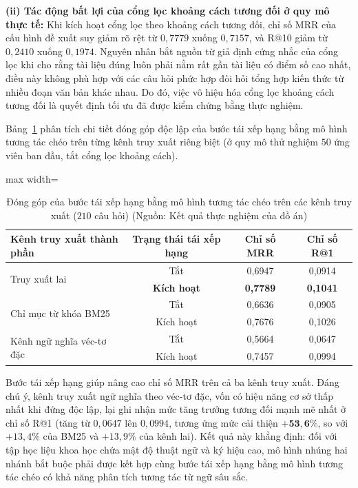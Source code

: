 \textbf{(ii) Tác động bất lợi của cổng lọc khoảng cách tương đối ở quy mô thực tế:} Khi kích hoạt cổng lọc theo khoảng cách tương đối, chỉ số MRR của cấu hình đề xuất suy giảm rõ rệt từ $0{,}7779$ xuống $0{,}7157$, và R@10 giảm từ $0{,}2410$ xuống $0{,}1974$. Nguyên nhân bắt nguồn từ giả định cứng nhắc của cổng lọc khi cho rằng tài liệu đúng luôn phải nằm rất gần tài liệu có điểm số cao nhất, điều này không phù hợp với các câu hỏi phức hợp đòi hỏi tổng hợp kiến thức từ nhiều đoạn văn bản khác nhau. Do đó, việc vô hiệu hóa cổng lọc khoảng cách tương đối là quyết định tối ưu đã được kiểm chứng bằng thực nghiệm.

Bảng~\ref{tab:ablation_rerank} phân tích chi tiết đóng góp độc lập của bước tái xếp hạng bằng mô hình tương tác chéo trên từng kênh truy xuất riêng biệt (ở quy mô thử nghiệm $50$ ứng viên ban đầu, tắt cổng lọc khoảng cách).

\begin{table}[H]
\centering
\caption{Đóng góp của bước tái xếp hạng bằng mô hình tương tác chéo trên các kênh truy xuất ($210$ câu hỏi) (Nguồn: Kết quả thực nghiệm của đồ án)}
\label{tab:ablation_rerank}
\small
\begin{adjustbox}{max width=\textwidth}
\begin{tabular}{lccc}
\toprule
\textbf{Kênh truy xuất thành phần} & \textbf{Trạng thái tái xếp hạng} & \textbf{Chỉ số MRR} & \textbf{Chỉ số R@1} \\
\midrule
\multirow{2}{*}{Truy xuất lai} & Tắt & 0,6947 & 0,0914 \\
 & \textbf{Kích hoạt} & \textbf{0,7789} & \textbf{0,1041} \\
\midrule
\multirow{2}{*}{Chỉ mục từ khóa BM25} & Tắt & 0,6636 & 0,0905 \\
 & Kích hoạt & 0,7676 & 0,1026 \\
\midrule
\multirow{2}{*}{Kênh ngữ nghĩa véc-tơ đặc} & Tắt & 0,5664 & 0,0647 \\
 & Kích hoạt & 0,7457 & 0,0994 \\
\bottomrule
\end{tabular}
\end{adjustbox}
\end{table}

Bước tái xếp hạng giúp nâng cao chỉ số MRR trên cả ba kênh truy xuất. Đáng chú ý, kênh truy xuất ngữ nghĩa theo véc-tơ đặc, vốn có hiệu năng cơ sở thấp nhất khi đứng độc lập, lại ghi nhận mức tăng trưởng tương đối mạnh mẽ nhất ở chỉ số R@1 (tăng từ $0{,}0647$ lên $0{,}0994$, tương ứng mức cải thiện $\mathbf{+53{,}6\%}$, so với $+13{,}4\%$ của BM25 và $+13{,}9\%$ của kênh lai). Kết quả này khẳng định: đối với tập học liệu khoa học chứa mật độ thuật ngữ và ký hiệu cao, mô hình nhúng hai nhánh bắt buộc phải được kết hợp cùng bước tái xếp hạng bằng mô hình tương tác chéo có khả năng phân tích tương tác từ ngữ sâu sắc.

